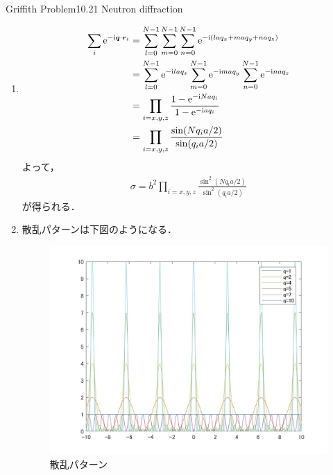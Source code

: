 \documentclass{report}
\begin{document}
\begin{myexc}{Griffith Problem10.21 Neutron diffraction}{}
\begin{enumerate}
\begin{align}
            \sigma = \abs{f^{(1)}(\theta)}^2 = b^2\abs{\sum_{i} \e^{-\i \bm{q}\cdot\bm{r}_i}}^2
          \end{align}
          である．
    \item \begin{align}
            \sum_{i} \mathrm{e}^{-\mathrm{i} \bm{q}\cdot\bm{r}_i} &= \sum_{l=0}^{N-1} \sum_{m=0}^{N-1} \sum_{n=0}^{N-1} \mathrm{e}^{-\mathrm{i}(laq_x + maq_y + naq_z)}\\
            &= \sum_{l=0}^{N-1} \mathrm{e}^{-\mathrm{i} laq_x} \sum_{m=0}^{N-1} \mathrm{e}^{-\mathrm{i} maq_y} \sum_{n=0}^{N-1} \mathrm{e}^{-\mathrm{i} naq_z}\\
            &= \prod_{i=x,y,z} \frac{1-\mathrm{e}^{-\mathrm{i} Naq_i}}{1-\mathrm{e}^{-\mathrm{i} aq_i}}\\
            &= \prod_{i =x,y,z} \frac{\sin(Nq_i a/2)}{\sin (q_i a/2)}
          \end{align}
          よって，
          \begin{align}
            \sigma = b^2 \prod_{i =x,y,z} \frac{\sin^2(Nq_i a/2)}{\sin^2 (q_i a/2)}
          \end{align}
          が得られる．
    \item 散乱パターンは下図のようになる．
          \begin{figure}[H]
            \centering
            \includegraphics[width=0.8\columnwidth]{fig/neutron_diffraction.jpg}
            \caption{散乱パターン}
            \label{neutron-diffraction}
          \end{figure}
  \end{enumerate}
  \end{myexc}
\end{document}
